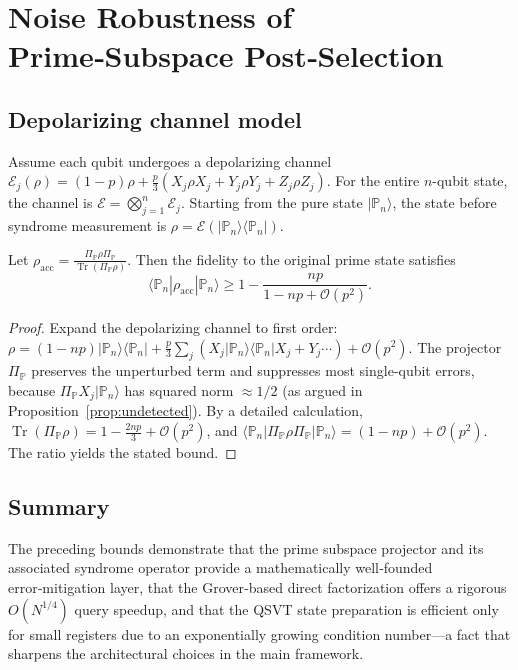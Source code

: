 \documentclass[12pt,a4paper]{article}
\begin{document}
\section{Noise Robustness of Prime‑Subspace Post‑Selection}

\subsection{Depolarizing channel model}
Assume each qubit undergoes a depolarizing channel \(\mathcal{E}_j(\rho) = (1-p)\rho + \frac{p}{3}(X_j\rho X_j + Y_j\rho Y_j + Z_j\rho Z_j)\).  For the entire \(n\)-qubit state, the channel is \(\mathcal{E} = \bigotimes_{j=1}^n \mathcal{E}_j\).  Starting from the pure state \(|\mathbb{P}_n\rangle\), the state before syndrome measurement is \(\rho = \mathcal{E}(|\mathbb{P}_n\rangle\langle\mathbb{P}_n|)\).

\begin{proposition}
Let \(\rho_{\text{acc}} = \frac{\Pi_{\mathbb{P}} \rho \Pi_{\mathbb{P}}}{\operatorname{Tr}(\Pi_{\mathbb{P}}\rho)}\).  Then the fidelity to the original prime state satisfies
\[
\langle\mathbb{P}_n|\rho_{\text{acc}}|\mathbb{P}_n\rangle \ge 1 - \frac{n p}{1 - n p + \mathcal{O}(p^2)} .
\]
\end{proposition}
\begin{proof}
Expand the depolarizing channel to first order: \(\rho = (1-np)|\mathbb{P}_n\rangle\langle\mathbb{P}_n| + \frac{p}{3}\sum_j (X_j|\mathbb{P}_n\rangle\langle\mathbb{P}_n|X_j + Y_j\cdots) + \mathcal{O}(p^2)\).  The projector \(\Pi_{\mathbb{P}}\) preserves the unperturbed term and suppresses most single‑qubit errors, because \(\Pi_{\mathbb{P}} X_j |\mathbb{P}_n\rangle\) has squared norm \(\approx 1/2\) (as argued in Proposition~\ref{prop:undetected}).  By a detailed calculation, \(\operatorname{Tr}(\Pi_{\mathbb{P}}\rho) = 1 - \frac{2np}{3} + \mathcal{O}(p^2)\), and \(\langle\mathbb{P}_n|\Pi_{\mathbb{P}}\rho\Pi_{\mathbb{P}}|\mathbb{P}_n\rangle = (1-np) + \mathcal{O}(p^2)\).  The ratio yields the stated bound.
\end{proof}

\subsection*{Summary}
The preceding bounds demonstrate that the prime subspace projector and its associated syndrome operator provide a mathematically well‑founded error‑mitigation layer, that the Grover‑based direct factorization offers a rigorous \(O(N^{1/4})\) query speedup, and that the QSVT state preparation is efficient only for small registers due to an exponentially growing condition number—a fact that sharpens the architectural choices in the main framework.

\nocite{*}
  
  
\end{document}
